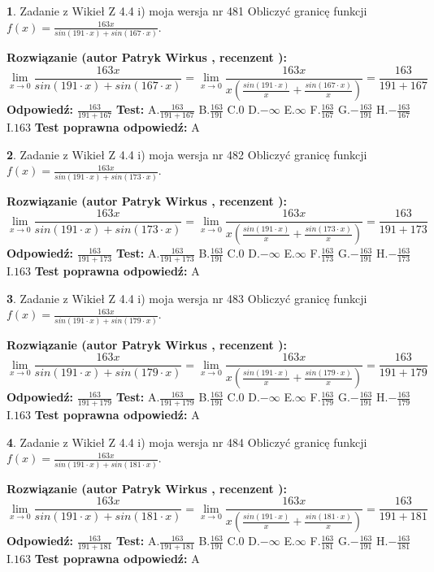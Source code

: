 \documentclass[12pt, a4paper]{article}
\theoremstyle{definition} %
\newtheorem{zad}{}
\newcommand{\zadStart}[1]{\begin{zad}#1\newline}
\newcommand{\zadStop}{\end{zad}}
\newcommand{\rozwStart}[2]{\noindent \textbf{Rozwiązanie (autor #1 , recenzent #2): }\newline}
\newcommand{\rozwStop}{\newline}
\newcommand{\odpStart}{\noindent \textbf{Odpowiedź:}\newline}
\newcommand{\odpStop}{\newline}
\newcommand{\testStart}{\noindent \textbf{Test:}\newline}
\newcommand{\testStop}{\newline}
\newcommand{\kluczStart}{\noindent \textbf{Test poprawna odpowiedź:}\newline}
\newcommand{\kluczStop}{\newline}
\begin{document}
\zadStart{Zadanie z Wikieł Z 4.4 i) moja wersja nr 481}
Obliczyć granicę funkcji $f(x)=\frac{163x}{sin(191\cdot x) +sin(167\cdot x)}$.
\zadStop
\rozwStart{Patryk Wirkus}{}
$$\lim\limits_{x\to 0}\frac{163x}{sin(191\cdot x) +sin(167\cdot x)}=\lim\limits_{x\to 0}\frac{163x}{x(\frac{sin(191\cdot x)}{x}+\frac{sin(167\cdot x)}{x})}=\frac{163}{191+167}$$
\rozwStop
\odpStart
$\frac{163}{191+167}$
\odpStop
\testStart
A.$\frac{163}{191+167}$
B.$\frac{163}{191}$
C.$0$
D.$-\infty$
E.$\infty$
F.$\frac{163}{167}$
G.$-\frac{163}{191}$
H.$-\frac{163}{167}$
I.$163$
\testStop
\kluczStart
A
\kluczStop



\zadStart{Zadanie z Wikieł Z 4.4 i) moja wersja nr 482}
Obliczyć granicę funkcji $f(x)=\frac{163x}{sin(191\cdot x) +sin(173\cdot x)}$.
\zadStop
\rozwStart{Patryk Wirkus}{}
$$\lim\limits_{x\to 0}\frac{163x}{sin(191\cdot x) +sin(173\cdot x)}=\lim\limits_{x\to 0}\frac{163x}{x(\frac{sin(191\cdot x)}{x}+\frac{sin(173\cdot x)}{x})}=\frac{163}{191+173}$$
\rozwStop
\odpStart
$\frac{163}{191+173}$
\odpStop
\testStart
A.$\frac{163}{191+173}$
B.$\frac{163}{191}$
C.$0$
D.$-\infty$
E.$\infty$
F.$\frac{163}{173}$
G.$-\frac{163}{191}$
H.$-\frac{163}{173}$
I.$163$
\testStop
\kluczStart
A
\kluczStop



\zadStart{Zadanie z Wikieł Z 4.4 i) moja wersja nr 483}
Obliczyć granicę funkcji $f(x)=\frac{163x}{sin(191\cdot x) +sin(179\cdot x)}$.
\zadStop
\rozwStart{Patryk Wirkus}{}
$$\lim\limits_{x\to 0}\frac{163x}{sin(191\cdot x) +sin(179\cdot x)}=\lim\limits_{x\to 0}\frac{163x}{x(\frac{sin(191\cdot x)}{x}+\frac{sin(179\cdot x)}{x})}=\frac{163}{191+179}$$
\rozwStop
\odpStart
$\frac{163}{191+179}$
\odpStop
\testStart
A.$\frac{163}{191+179}$
B.$\frac{163}{191}$
C.$0$
D.$-\infty$
E.$\infty$
F.$\frac{163}{179}$
G.$-\frac{163}{191}$
H.$-\frac{163}{179}$
I.$163$
\testStop
\kluczStart
A
\kluczStop



\zadStart{Zadanie z Wikieł Z 4.4 i) moja wersja nr 484}
Obliczyć granicę funkcji $f(x)=\frac{163x}{sin(191\cdot x) +sin(181\cdot x)}$.
\zadStop
\rozwStart{Patryk Wirkus}{}
$$\lim\limits_{x\to 0}\frac{163x}{sin(191\cdot x) +sin(181\cdot x)}=\lim\limits_{x\to 0}\frac{163x}{x(\frac{sin(191\cdot x)}{x}+\frac{sin(181\cdot x)}{x})}=\frac{163}{191+181}$$
\rozwStop
\odpStart
$\frac{163}{191+181}$
\odpStop
\testStart
A.$\frac{163}{191+181}$
B.$\frac{163}{191}$
C.$0$
D.$-\infty$
E.$\infty$
F.$\frac{163}{181}$
G.$-\frac{163}{191}$
H.$-\frac{163}{181}$
I.$163$
\testStop
\kluczStart
A
\kluczStop
\end{document}
